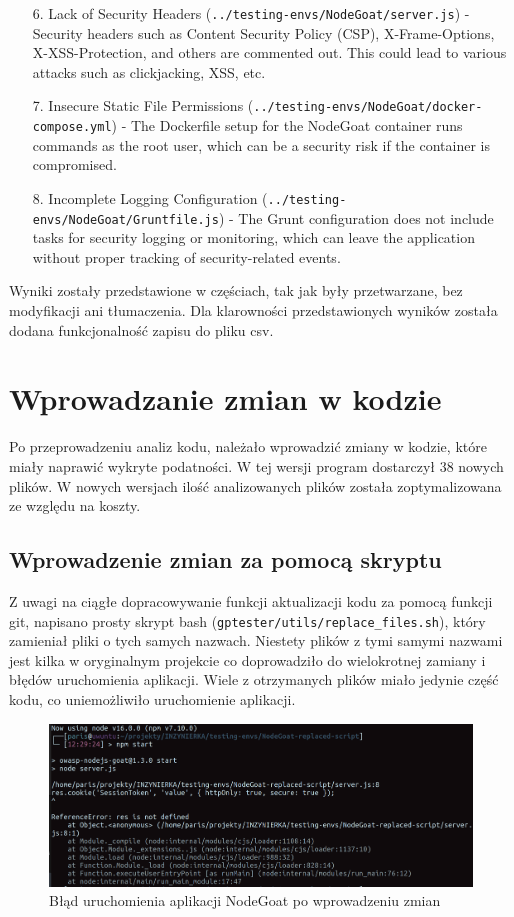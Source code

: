 \begin{enumerate}
  \item[6.] Lack of Security Headers (\texttt{../testing-envs/NodeGoat/server.js}) - Security headers such as Content Security Policy (CSP), X-Frame-Options, X-XSS-Protection, and others are commented out. This could lead to various attacks such as clickjacking, XSS, etc.
  \item[7.] Insecure Static File Permissions (\texttt{../testing-envs/NodeGoat/docker-compose.yml}) - The Dockerfile setup for the NodeGoat container runs commands as the root user, which can be a security risk if the container is compromised.
  \item[8.] Incomplete Logging Configuration (\texttt{../testing-envs/NodeGoat/Gruntfile.js}) - The Grunt configuration does not include tasks for security logging or monitoring, which can leave the application without proper tracking of security-related events.
\end{enumerate}
Wyniki zostały przedstawione w częściach, tak jak były przetwarzane, bez modyfikacji ani tłumaczenia. Dla klarowności przedstawionych wyników została dodana funkcjonalność zapisu do pliku csv.

\section{Wprowadzanie zmian w kodzie}
Po przeprowadzeniu analiz kodu, należało wprowadzić zmiany w kodzie, które miały naprawić wykryte podatności. W tej wersji program dostarczył 38 nowych plików. W nowych wersjach ilość analizowanych plików została zoptymalizowana ze względu na koszty.
\subsection{Wprowadzenie zmian za pomocą skryptu}
Z uwagi na ciągłe dopracowywanie funkcji aktualizacji kodu za pomocą funkcji git, napisano prosty skrypt bash (\texttt{gptester/utils/replace\_files.sh}), który zamieniał pliki o tych samych nazwach. Niestety plików z tymi samymi nazwami jest kilka w oryginalnym projekcie co doprowadziło do wielokrotnej zamiany i błędów uruchomienia aplikacji. Wiele z otrzymanych plików miało jedynie część kodu, co uniemożliwiło uruchomienie aplikacji.

\begin{figure}[H]
  \centering
  \includegraphics[width=\linewidth]{img/npm-start-error.png}
  \caption{Błąd uruchomienia aplikacji NodeGoat po wprowadzeniu zmian}
  \label{fig:nodegoat-error-after}
\end{figure}

